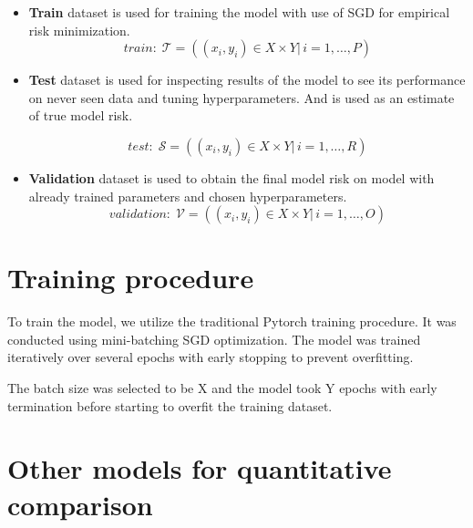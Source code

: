 \begin{itemize}
    \item \textbf{Train} dataset is used for training the model with use of \acrlong{SGD} for empirical risk minimization.
          \begin{equation}
              \label{eq:train}
              \textit{train}: \; \mathcal{T} = ((x_i, y_i) \in X \times Y |\, i = 1,\dots, P)
          \end{equation}
          \vspace{3mm}


    \item \textbf{Test} dataset is used for inspecting results of the model to see its performance on never seen data and tuning hyperparameters. And is used as an estimate of true model risk.

          \begin{equation}
              \label{eq:test}
              \textit{test}:       \; \mathcal{S}  = ((x_i, y_i) \in X \times Y |\, i = 1,\dots, R)
          \end{equation}
          \vspace{3mm}
    \item \textbf{Validation} dataset is used to obtain the final model risk on model with already trained parameters and chosen hyperparameters.
          \begin{equation}
              \label{eq:validation}
              \textit{validation}: \; \mathcal{V} = ((x_i, y_i) \in X \times Y |\, i = 1,\dots, O)
          \end{equation}
\end{itemize}

\section{Training procedure}

To train the model, we utilize the traditional Pytorch training procedure.
It was conducted using mini-batching \acrfull{SGD} optimization. The model was trained iteratively over several epochs with early stopping to prevent overfitting.

The batch size was selected to be X and the model took Y  epochs with early termination before starting to overfit the training dataset.



\section{Other models for quantitative comparison}

